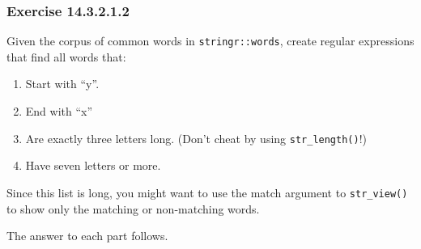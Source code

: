 \documentclass[]{book}
\providecommand{\tightlist}{%
  \setlength{\itemsep}{0pt}\setlength{\parskip}{0pt}}
\theoremstyle{plain}
\theoremstyle{remark}
\begin{document}
\hypertarget{exercise-14.3.2.1.2}{%
\subsubsection*{\texorpdfstring{Exercise
{14.3.2.1.2}}{Exercise 14.3.2.1.2}}\label{exercise-14.3.2.1.2}}

Given the corpus of common words in \texttt{stringr::words}, create
regular expressions that find all words that:

\begin{enumerate}
\def\labelenumi{\arabic{enumi}.}
\tightlist
\item
  Start with ``y''.
\item
  End with ``x''
\item
  Are exactly three letters long. (Don't cheat by using
  \texttt{str\_length()}!)
\item
  Have seven letters or more.
\end{enumerate}

Since this list is long, you might want to use the match argument to
\texttt{str\_view()} to show only the matching or non-matching words.

The answer to each part follows.
\end{document}

